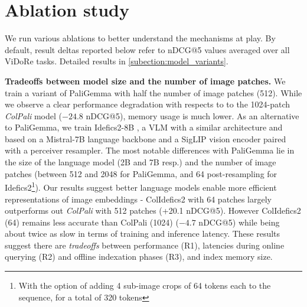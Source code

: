 \documentclass{article} %
\begin{document}
\section{Ablation study}
\label{section:ablation_study}

We run various ablations to better understand the mechanisms at play. By default, result deltas reported below refer to nDCG@5 values averaged over all ViDoRe tasks.  Detailed results in \ref{subection:model_variants}.


\noindent\textbf{Tradeoffs between model size and the number of image patches.} We train a variant of PaliGemma with half the number of image patches (512). %
While we observe a clear performance degradation with respects to to the 1024-patch \textit{ColPali} model ($-24.8$ nDCG@5), memory usage is much lower.
As an alternative to PaliGemma, we train Idefics2-8B \citep{laurencon_what_2024}, a VLM with a similar architecture and based on a Mistral-7B \citep{jiang_mistral_2023} language backbone and a SigLIP vision encoder paired with a perceiver resampler. The most notable differences with PaliGemma lie in the size of the language model (2B and 7B resp.) and the number of image patches (between 512 and 2048 for PaliGemma, and 64 post-resampling for Idefics2\footnote{With the option of adding 4 sub-image crops of 64 tokens each to the sequence, for a total of 320 tokens}). Our results suggest better language models enable more efficient representations of image embeddings - ColIdefics2 with 64 patches largely outperforms out \textit{ColPali} with 512 patches (+20.1 nDCG@5). However ColIdefics2 (64) remains less accurate than ColPali (1024) ($-4.7$ nDCG@5) while being about twice as slow in terms of training and inference latency.
%
These results suggest there are \textit{tradeoffs} between performance (R1), latencies during online querying (R2) and offline indexation phases (R3), and index memory size.
\end{document}

